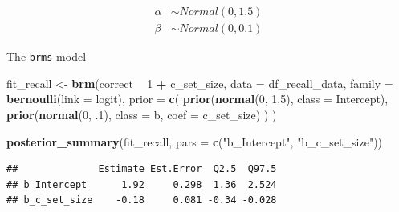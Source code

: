 \documentclass[12pt,ignorenonframetext,aspectratio=169]{beamer}
\newenvironment{Shaded}{\begin{snugshade}}{\end{snugshade}}
\newcommand{\DataTypeTok}[1]{\textcolor[rgb]{0.13,0.29,0.53}{#1}}
\newcommand{\DecValTok}[1]{\textcolor[rgb]{0.00,0.00,0.81}{#1}}
\newcommand{\FloatTok}[1]{\textcolor[rgb]{0.00,0.00,0.81}{#1}}
\newcommand{\KeywordTok}[1]{\textcolor[rgb]{0.13,0.29,0.53}{\textbf{#1}}}
\newcommand{\NormalTok}[1]{#1}
\newcommand{\OperatorTok}[1]{\textcolor[rgb]{0.81,0.36,0.00}{\textbf{#1}}}
\newcommand{\StringTok}[1]{\textcolor[rgb]{0.31,0.60,0.02}{#1}}
\begin{document}
\begin{frame}

\begin{equation}
\begin{aligned}
\alpha &\sim Normal(0, 1.5) \\
\beta &\sim Normal(0, 0.1) 
\end{aligned}
\end{equation}

\end{frame}

\begin{frame}[fragile]{The \texttt{brms} model}
\protect\hypertarget{the-brms-model}{}

\small

\begin{Shaded}
\begin{Highlighting}[]
\NormalTok{fit_recall <-}\StringTok{ }\KeywordTok{brm}\NormalTok{(correct }\OperatorTok{~}\StringTok{ }\DecValTok{1} \OperatorTok{+}\StringTok{ }\NormalTok{c_set_size,}
  \DataTypeTok{data =}\NormalTok{ df_recall_data,}
  \DataTypeTok{family =} \KeywordTok{bernoulli}\NormalTok{(}\DataTypeTok{link =}\NormalTok{ logit),}
  \DataTypeTok{prior =} \KeywordTok{c}\NormalTok{(}
    \KeywordTok{prior}\NormalTok{(}\KeywordTok{normal}\NormalTok{(}\DecValTok{0}\NormalTok{, }\FloatTok{1.5}\NormalTok{), }\DataTypeTok{class =}\NormalTok{ Intercept),}
    \KeywordTok{prior}\NormalTok{(}\KeywordTok{normal}\NormalTok{(}\DecValTok{0}\NormalTok{, }\FloatTok{.1}\NormalTok{), }\DataTypeTok{class =}\NormalTok{ b, }\DataTypeTok{coef =}\NormalTok{ c_set_size)}
\NormalTok{  )}
\NormalTok{)}
\end{Highlighting}
\end{Shaded}

\normalsize

\end{frame}

\begin{frame}[fragile]

\small

\begin{Shaded}
\begin{Highlighting}[]
\KeywordTok{posterior_summary}\NormalTok{(fit_recall, }\DataTypeTok{pars =} \KeywordTok{c}\NormalTok{(}\StringTok{"b_Intercept"}\NormalTok{, }\StringTok{"b_c_set_size"}\NormalTok{))}
\end{Highlighting}
\end{Shaded}

\begin{verbatim}
##              Estimate Est.Error  Q2.5  Q97.5
## b_Intercept      1.92     0.298  1.36  2.524
## b_c_set_size    -0.18     0.081 -0.34 -0.028
\end{verbatim}

\normalsize

\end{frame}
\end{document}
